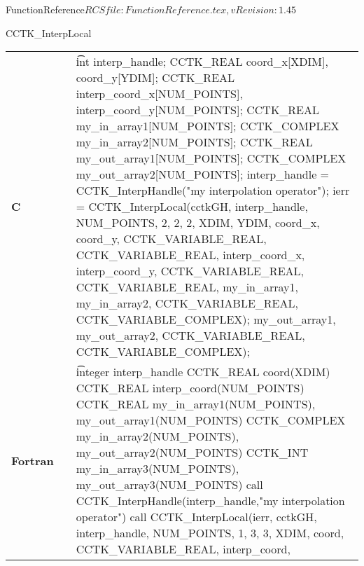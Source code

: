 \begin{cactuspart}{5}{FunctionReference}{$RCSfile: FunctionReference.tex,v $}{$Revision: 1.45 $}
\begin{CCTKFunc}{CCTK\_InterpLocal}
\begin{params}
\end{params}
\begin{discussion}
\end{discussion}
\begin{examples}
\begin{tabular}{@{}p{3cm}cp{11cm}}
\hfill {\bf C} && {\t
int interp\_handle;
CCTK\_REAL coord\_x[XDIM], coord\_y[YDIM];
CCTK\_REAL interp\_coord\_x[NUM\_POINTS], interp\_coord\_y[NUM\_POINTS];
CCTK\_REAL my\_in\_array1[NUM\_POINTS];
CCTK\_COMPLEX  my\_in\_array2[NUM\_POINTS];
CCTK\_REAL my\_out\_array1[NUM\_POINTS];
CCTK\_COMPLEX  my\_out\_array2[NUM\_POINTS];\linebreak
interp\_handle =\vfill
\hspace{2ex} CCTK\_InterpHandle("my interpolation operator");
ierr = CCTK\_InterpLocal(cctkGH,\vfill
\hspace{2ex} interp\_handle, NUM\_POINTS, 2, 2, 2,\vfill
\hspace{2ex} XDIM, YDIM, coord\_x, coord\_y,\vfill
\hspace{2ex} CCTK\_VARIABLE\_REAL, CCTK\_VARIABLE\_REAL,\vfill
\hspace{2ex} interp\_coord\_x, interp\_coord\_y,\vfill
\hspace{2ex} CCTK\_VARIABLE\_REAL, CCTK\_VARIABLE\_REAL,\vfill
\hspace{2ex} my\_in\_array1, my\_in\_array2,\vfill
\hspace{2ex} CCTK\_VARIABLE\_REAL, CCTK\_VARIABLE\_COMPLEX);
\hspace{2ex} my\_out\_array1, my\_out\_array2,\vfill
\hspace{2ex} CCTK\_VARIABLE\_REAL, CCTK\_VARIABLE\_COMPLEX);
}
\\
\hfill {\bf Fortran} && {\t
integer interp\_handle
CCTK\_REAL coord(XDIM)
CCTK\_REAL interp\_coord(NUM\_POINTS)
CCTK\_REAL my\_in\_array1(NUM\_POINTS), my\_out\_array1(NUM\_POINTS)
CCTK\_COMPLEX my\_in\_array2(NUM\_POINTS), my\_out\_array2(NUM\_POINTS)
CCTK\_INT my\_in\_array3(NUM\_POINTS), my\_out\_array3(NUM\_POINTS)\linebreak
call CCTK\_InterpHandle(interp\_handle,\vfill\hspace{2ex}"my interpolation operator")
call CCTK\_InterpLocal(ierr, cctkGH,\vfill
\hspace{2ex} interp\_handle, NUM\_POINTS, 1, 3, 3,\vfill
\hspace{2ex} XDIM, coord,\vfill
\hspace{2ex} CCTK\_VARIABLE\_REAL,\vfill
\hspace{2ex} interp\_coord,\vfill
}
\end{tabular}
\end{examples}
\end{CCTKFunc}
\end{cactuspart}
